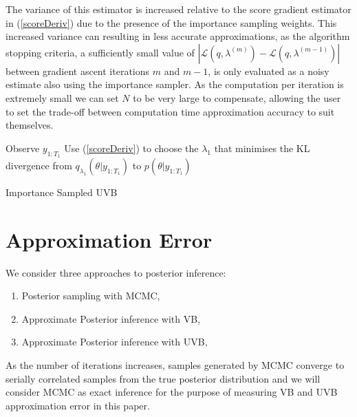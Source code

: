 \documentclass[12pt,a4paper]{article}\usepackage[]{graphicx}\usepackage[]{color}
\begin{document}
The variance of this estimator is increased relative to the score gradient estimator in (\ref{scoreDeriv}) due to the presence of the importance sampling weights. This increased variance can resulting in less accurate approximations, as the algorithm stopping criteria, a sufficiently small value of $|\mathcal{L}(q, \lambda^{(m)}) - \mathcal{L}(q, \lambda^{(m-1)})|$ between gradient ascent iterations $m$ and $m-1$, is only evaluated as a noisy estimate also using the importance sampler. As the computation per iteration is extremely small we can set $N$ to be very large to compensate, allowing the user to set the trade-off between computation time approximation accuracy to suit themselves.
\\

\vspace{2mm}
\begin{algorithm}[H]
 Observe $y_{1:T_1}$\;
 Use (\ref{scoreDeriv}) to choose the $\lambda_1$ that minimises the KL divergence from $q_{\lambda_1}(\theta | y_{1:T_1})$ to $p(\theta | y_{1:T_1})$\;
 \caption{Importance Sampled UVB}
  \label{alg:UVBIS}
\end{algorithm}


\iffalse
\section{Approximation Error}

We consider three approaches to posterior inference:
\begin{enumerate}
\item Posterior sampling with MCMC,
\item Approximate Posterior inference with VB,
\item Approximate Posterior inference with UVB,
\end{enumerate}

As the number of iterations increases, samples generated by MCMC converge to serially correlated samples from the true posterior distribution and we will consider MCMC as exact inference for the purpose of measuring VB and UVB approximation error in this paper.
\\
\end{document}
